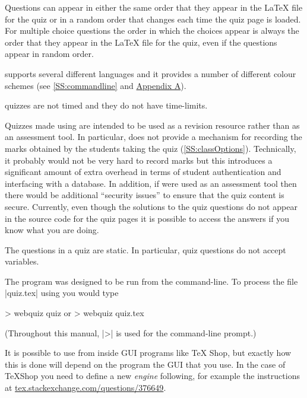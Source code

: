 \documentclass[svgnames]{article}
\begin{document}
      Questions can appear in either the same order that they appear in
      the \LaTeX{} file for the quiz or in a random order that changes
      each time the quiz page is loaded. For multiple choice questions the
      order in which the choices appear is always the order that they
      appear in the \LaTeX{} file for the quiz, even if the questions
      appear in random order.

      \WebQuiz supports several different languages and it
      provides a number of different colour schemes (see
      \autoref{SS:commandline} and \hyperref[SS:themes]{Appendix A}).

      \WebQuiz quizzes are not timed and they do not have time-limits.

      Quizzes made using \WebQuiz are intended to be used as a
      revision resource rather than as an assessment tool. In particular,
      \WebQuiz does not provide a mechanism for recording the marks
      obtained by the students taking the quiz
      (\autoref{SS:classOptions}). Technically, it probably would not be
      very hard to record marks but this introduces a significant amount
      of extra overhead in terms of student authentication and interfacing
      with a database. In addition, if \WebQuiz were used as an assessment
      tool then there would be additional ``security issues'' to ensure
      that the quiz content is secure. Currently, even though the
      solutions to the quiz questions do not appear in the \HTML source
      code for the quiz pages it is possible to access the answers if you
      know what you are doing.

      The questions in a \WebQuiz quiz are static. In particular,
      \WebQuiz quiz questions do not accept variables.

      The \WebQuiz program was designed to be run from the command-line.
      To process the file \BashCode|quiz.tex| using \WebQuiz you would
      type
      \begin{bashcode}
        > webquiz quiz         or         > webquiz quiz.tex
      \end{bashcode}
      (Throughout this manual, \BashCode|>| is used for the command-line
      prompt.)

      It is possible to use \WebQuiz from inside GUI programs like \TeX
      Shop, but exactly how this is done will depend on the program the
      GUI that you use. In the case of \TeX Shop you need to define a
      new \textit{engine} following, for example the instructions at
      \href{https://tex.stackexchange.com/questions/376649}
           {tex.stackexchange.com/questions/376649}.
\end{document}
